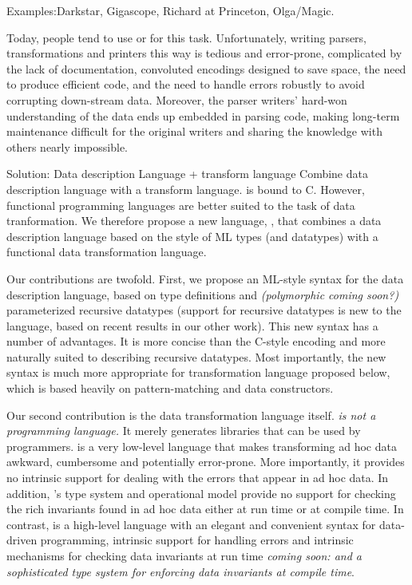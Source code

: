 \documentclass{entcs}
\begin{document}
Examples:Darkstar, Gigascope, Richard at Princeton, Olga/Magic.

Today, people tend to use \C{} or \perl{} for this task.
Unfortunately, writing parsers, transformations and printers this way
is tedious and error-prone, complicated by the lack of documentation,
convoluted encodings designed to save space, the need to produce
efficient code, and the need to handle errors robustly to avoid
corrupting down-stream data.  Moreover, the parser writers' hard-won
understanding of the data ends up embedded in parsing code, making
long-term maintenance difficult for the original writers and sharing
the knowledge with others nearly impossible.

Solution: Data description Language + transform language
Combine data description language with a transform language.
\pads{} is bound to C. However, functional programming languages are
better suited to the task of data tranformation. We therefore propose
a new language, \datatype{}, that combines a data description language
based on the style of ML types (and datatypes) with a functional data
transformation language. 

Our contributions are twofold. First, we propose an ML-style syntax
for the \pads{} data description language, based on type definitions
and {\em(polymorphic coming soon?)} parameterized recursive datatypes
(support for recursive datatypes is new to the \pads{} language, based
on recent results in our other work). This new syntax has a number of
advantages. It is more concise than the C-style encoding and more
naturally suited to describing recursive datatypes. Most importantly,
the new syntax is much more appropriate for transformation language
proposed below, which is based heavily on pattern-matching and data
constructors.

Our second contribution is the data transformation language itself.
{\em \pads{} is not a programming language.}  It merely generates
libraries that can be used by \C{} programmers.  \C{} is a very
low-level language that makes transforming ad hoc data awkward,
cumbersome and potentially error-prone.  More importantly, it provides
no intrinsic support for dealing with the errors that appear in ad hoc
data.  In addition, \C's type system and operational model provide no
support for checking the rich invariants found in ad hoc data either
at run time or at compile time.  In contrast, \datatype{} is a
high-level language with an elegant and convenient syntax for
data-driven programming, intrinsic support for handling errors and
intrinsic mechanisms for checking data invariants at run time {\em
  coming soon: and a sophisticated type system for enforcing data
  invariants at compile time}. 
\end{document}
